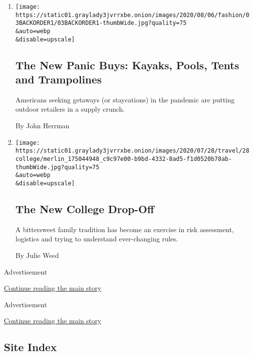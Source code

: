 \begin{enumerate}
\def\labelenumi{\arabic{enumi}.}
\item
  \href{/2020/08/04/style/outdoor-camping-gear-pools-backordered.html}{}

  \texttt{[image: https://static01.graylady3jvrrxbe.onion/images/2020/08/06/fashion/03BACKORDER1/03BACKORDER1-thumbWide.jpg?quality=75\\\&auto=webp\\\&disable=upscale]}

  \hypertarget{the-new-panic-buys-kayaks-pools-tents-and-trampolines}{%
  \subsection{The New Panic Buys: Kayaks, Pools, Tents and
  Trampolines}\label{the-new-panic-buys-kayaks-pools-tents-and-trampolines}}

  Americans seeking getaways (or staycations) in the pandemic are
  putting outdoor retailers in a supply crunch.

  By John Herrman
\item
  \href{/2020/07/29/travel/virus-college-travel-restrictions.html}{}

  \texttt{[image: https://static01.graylady3jvrrxbe.onion/images/2020/07/28/travel/28college/merlin\_175044948\_c9c97e00-b9bd-4332-8ad5-f1d0520b78ab-thumbWide.jpg?quality=75\\\&auto=webp\\\&disable=upscale]}

  \hypertarget{the-new-college-drop-off}{%
  \subsection{The New College Drop-Off}\label{the-new-college-drop-off}}

  A bittersweet family tradition has become an exercise in risk
  assessment, logistics and trying to understand ever-changing rules.

  By Julie Weed
\end{enumerate}

Advertisement

\protect\hyperlink{after-mid2}{Continue reading the main story}

Advertisement

\protect\hyperlink{after-mktg}{Continue reading the main story}

\hypertarget{site-index}{%
\subsection{Site Index}\label{site-index}}


